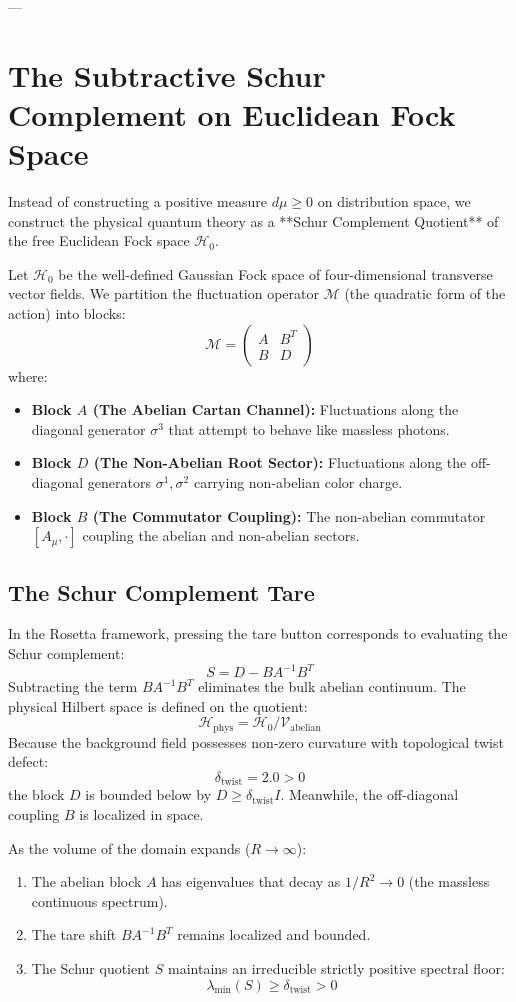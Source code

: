 \documentclass[11pt,a4paper]{article}
\begin{document}
---

\section{The Subtractive Schur Complement on Euclidean Fock Space}

Instead of constructing a positive measure $d\mu \ge 0$ on distribution space, we construct the physical quantum theory as a **Schur Complement Quotient** of the free Euclidean Fock space $\mathcal{H}_0$.

Let $\mathcal{H}_0$ be the well-defined Gaussian Fock space of four-dimensional transverse vector fields. We partition the fluctuation operator $\mathcal{M}$ (the quadratic form of the action) into blocks:
$$\mathcal{M} = \begin{pmatrix} A & B^T \\ B & D \end{pmatrix}$$
where:
\begin{itemize}
    \item \textbf{Block $A$ (The Abelian Cartan Channel):} Fluctuations along the diagonal generator $\sigma^3$ that attempt to behave like massless photons.
    \item \textbf{Block $D$ (The Non-Abelian Root Sector):} Fluctuations along the off-diagonal generators $\sigma^1, \sigma^2$ carrying non-abelian color charge.
    \item \textbf{Block $B$ (The Commutator Coupling):} The non-abelian commutator $[A_\mu, \cdot]$ coupling the abelian and non-abelian sectors.
\end{itemize}

\subsection{The Schur Complement Tare}
In the Rosetta framework, pressing the tare button corresponds to evaluating the Schur complement:
$$S = D - B A^{-1} B^T$$
Subtracting the term $B A^{-1} B^T$ eliminates the bulk abelian continuum. The physical Hilbert space is defined on the quotient:
$$\mathcal{H}_{\mathrm{phys}} = \mathcal{H}_0 / \mathcal{V}_{\mathrm{abelian}}$$
Because the background field possesses non-zero curvature with topological twist defect:
$$\delta_{\mathrm{twist}} = 2.0 > 0$$
the block $D$ is bounded below by $D \ge \delta_{\mathrm{twist}} I$. Meanwhile, the off-diagonal coupling $B$ is localized in space. 

As the volume of the domain expands ($R \to \infty$):
\begin{enumerate}
    \item The abelian block $A$ has eigenvalues that decay as $1/R^2 \to 0$ (the massless continuous spectrum).
    \item The tare shift $B A^{-1} B^T$ remains localized and bounded.
    \item The Schur quotient $S$ maintains an irreducible strictly positive spectral floor:
    $$\lambda_{\min}(S) \ge \delta_{\mathrm{twist}} > 0$$
\end{enumerate}
\end{document}
